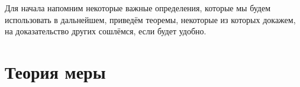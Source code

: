 \documentclass[a4paper,14pt]{article}
\begin{document}
Для начала напомним некоторые важные определения, которые мы будем использовать в дальнейшем, приведём теоремы, некоторые из которых докажем, на доказательство других сошлёмся, если будет удобно.

\section{Теория меры}
\end{document}
